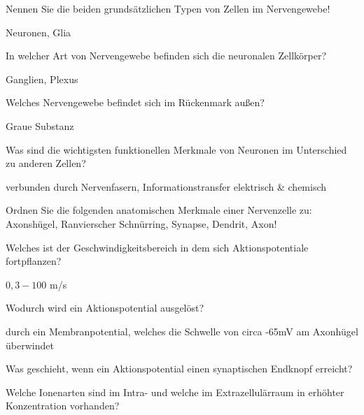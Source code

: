 \documentclass[10pt, a4paper]{exam}
\begin{document}
\begin{questions}
  \question Nennen Sie die beiden grundsätzlichen Typen von Zellen im Nervengewebe!
  \begin{solution}
    Neuronen, Glia
  \end{solution}

  \question In welcher Art von Nervengewebe befinden sich die neuronalen Zellkörper?
  \begin{solution}
    Ganglien, Plexus
  \end{solution}

  \question Welches Nervengewebe befindet sich im Rückenmark außen?
  \begin{solution}
    Graue Substanz
  \end{solution}

  \question Was sind die wichtigsten funktionellen Merkmale von Neuronen im Unterschied zu anderen Zellen?
  \begin{solution}
    verbunden durch Nervenfasern, Informationstransfer elektrisch \& chemisch
  \end{solution}

  \question Ordnen Sie die folgenden anatomischen Merkmale einer Nervenzelle zu: Axonshügel, Ranvierscher Schnürring, Synapse, Dendrit, Axon!
  \begin{solution}

  \end{solution}

  \question Welches ist der Geschwindigkeitsbereich in dem sich Aktionspotentiale fortpflanzen?
  \begin{solution}
    $0,3 - 100$ m/s
  \end{solution}

  \question Wodurch wird ein Aktionspotential ausgelöst?
  \begin{solution}
    durch ein Membranpotential, welches die Schwelle von circa -65mV am Axonhügel überwindet
  \end{solution}

  \question Was geschieht, wenn ein Aktionspotential einen synaptischen Endknopf erreicht?
  \begin{solution}

  \end{solution}

  \question Welche Ionenarten sind im Intra- und welche im Extrazellulärraum in erhöhter Konzentration vorhanden?
  \begin{solution}

  \end{solution}


\end{questions}
\end{document}
